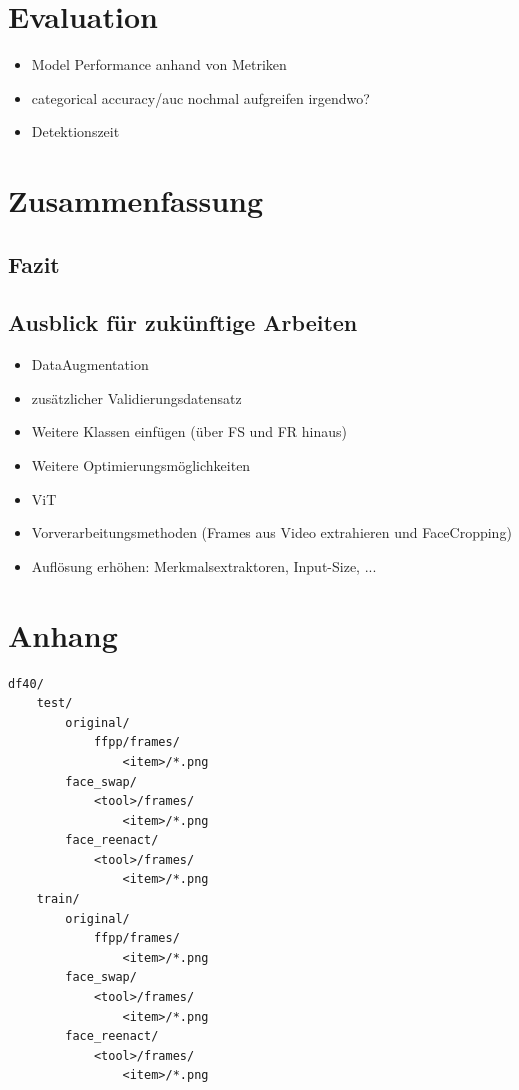 \documentclass{article}
\begin{document}
\section{Evaluation}

    \begin{itemize}
        \item Model Performance anhand von Metriken
        \item categorical accuracy/auc nochmal aufgreifen irgendwo?
        \item Detektionszeit
    \end{itemize}

    \section{Zusammenfassung}
    \subsection{Fazit}
    \subsection{Ausblick für zukünftige Arbeiten}
    \begin{itemize}
        \item DataAugmentation
        \item zusätzlicher Validierungsdatensatz %
        \item Weitere Klassen einfügen (über FS und FR hinaus)
        \item Weitere Optimierungsmöglichkeiten
        \item ViT
        \item Vorverarbeitungsmethoden (Frames aus Video extrahieren und FaceCropping)
        \item Auflösung erhöhen: Merkmalsextraktoren, Input-Size, ...
    \end{itemize}




\section*{Anhang}
\begin{lstlisting}[label={apx:lst.df40},caption={Ordnerstruktur des DF40-Datensets im \texttt{io/}-Verzeichnis}]
df40/
    test/
        original/
            ffpp/frames/
                <item>/*.png
        face_swap/
            <tool>/frames/
                <item>/*.png
        face_reenact/
            <tool>/frames/
                <item>/*.png
    train/
        original/
            ffpp/frames/
                <item>/*.png
        face_swap/
            <tool>/frames/
                <item>/*.png
        face_reenact/
            <tool>/frames/
                <item>/*.png
\end{lstlisting}
\end{document}
